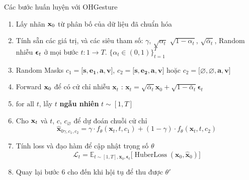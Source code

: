 \begin{frame}{Các bước huấn luyện với OHGesture}
	\begin{enumerate}
		\item  Lấy nhãn $\mathbf{x}_0$ từ phân bố của dữ liệu đã chuẩn hóa
		\item Tính sẵn các giá trị, và các siêu tham số: $\gamma$, $\sqrt{\alpha_t}$ $\sqrt{1 - \alpha_t}$, $\sqrt{\bar{\alpha}_t}$, Random nhiễu ${\boldsymbol{\epsilon}}_t$ ở mọi bước $t: 1 \rightarrow T$.
		$\{\alpha_t \in (0, 1)\}_{t=1}^T$
		\item Random Masks  $c_{1} = \big[ \mathbf{s} , \mathbf{e_1}, \mathbf{a}, \mathbf{v} \big]$, $c_{2} = \big[ \mathbf{s} , \mathbf{e_2}, \mathbf{a}, \mathbf{v}\big]$ hoặc $c_{2} = \big[ \varnothing , \varnothing, \mathbf{a},  \mathbf{v} \big]$
		\item Forward $\mathbf{x}_0$ để có cử chỉ nhiễu $\mathbf{x}_t$ :  $\mathbf{x}_t = \sqrt{\bar{\alpha}_t}\mathbf{x}_0 + \sqrt{1 - \bar{\alpha}_t}\boldsymbol{\epsilon}_t$
		\item $\text{for all}$ $t$, lẫy $t$ \textbf{ngẫu nhiên} $t \sim [1, T]$
		\item Cho $\mathbf{x}_t$ và $t$, $c$, $c_{\varnothing}$ để dự đoán chuỗi cử chỉ
		\begin{equation}
			\hat{\mathbf{x}}_{0 \gamma, c_{1}, c_{2}}=\gamma \cdot f_{\theta}  \left(\mathbf{x}_{t}, t, c_{1}\right)+(1-\gamma) \cdot f_{\theta} \left(\mathbf{x}_{t}, t, c_{2}\right)
		\end{equation}

		\item Tính loss và đạo hàm để cập nhật trọng số $\theta$
		\begin{equation}
			\mathcal{L}_t = \mathbb{E}_{t \sim [1, T], \mathbf{x}_0, \boldsymbol{\epsilon}_t} \Big[ \operatorname{HuberLoss}(\mathbf{x}_0, \hat{\mathbf{x}}_0 ) \Big]
		\end{equation}
	
	
		\item Quay lại bước 6 cho đến khi hội tụ để thu được $\theta'$
	\end{enumerate}
\end{frame}


